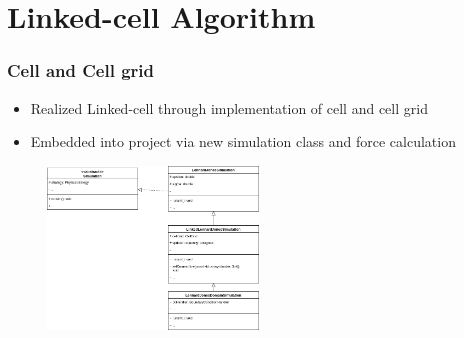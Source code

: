 
\section{Linked-cell Algorithm}
\label{sec:lc}

\begin{frame}
    \frametitle{Cell and Cell grid}

    \begin{itemize}
        \item Realized Linked-cell through implementation of cell and cell grid
        \item Embedded into project via new simulation class and force calculation
    \end{itemize}
    \begin{figure}
        \label{fig:umlsim}
        \includegraphics[width=0.5\textwidth]{../../res/UMLSimulation3.drawio}
    \end{figure}
\end{frame}
